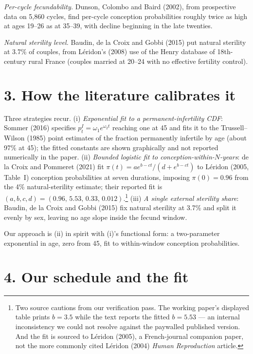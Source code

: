 \documentclass[11pt]{article}
\begin{document}
\emph{Per-cycle fecundability.} Dunson, Colombo and Baird (2002), from
prospective data on 5{,}860 cycles, find per-cycle conception probabilities
roughly twice as high at ages 19--26 as at 35--39, with decline beginning in
the late twenties.

\emph{Natural sterility level.} Baudin, de la Croix and Gobbi (2015) put
natural sterility at 3.7\% of couples, from L\'eridon's (2008) use of the
Henry database of 18th-century rural France (couples married at 20--24 with
no effective fertility control).

\section*{3. How the literature calibrates it}

Three strategies recur. (i) \emph{Exponential fit to a permanent-infertility
CDF}: Sommer (2016) specifies $p^I_t=\omega_1 e^{\omega_2 t}$ reaching one
at 45 and fits it to the Trussell--Wilson (1985) point estimates of the
fraction permanently infertile by age (about 97\% at 45); the fitted
constants are shown graphically and not reported numerically in the paper.
(ii) \emph{Bounded logistic fit to conception-within-$N$-years}: de la Croix
and Pommeret (2021) fit $\pi(t)=a e^{b-ct}/(d+e^{b-ct})$ to L\'eridon (2005,
Table~I) conception probabilities at seven durations, imposing
$\pi(0)=0.96$ from the 4\% natural-sterility estimate; their reported fit is
$(a,b,c,d)=(0.96,\,5.53,\,0.33,\,0.012)$.\footnote{Two source cautions from
our verification pass. The working paper's displayed table prints $b=3.5$
while the text reports the fitted $b=5.53$ --- an internal inconsistency we
could not resolve against the paywalled published version. And the fit is
sourced to L\'eridon (2005), a French-journal companion paper, not the more
commonly cited L\'eridon (2004) \emph{Human Reproduction} article.}
(iii) \emph{A single external sterility share}: Baudin, de la Croix and
Gobbi (2015) fix natural sterility at 3.7\% and split it evenly by sex,
leaving no age slope inside the fecund window.

Our approach is (ii) in spirit with (i)'s functional form: a two-parameter
exponential in age, zero from 45, fit to within-window conception
probabilities.

\section*{4. Our schedule and the fit}
\end{document}
